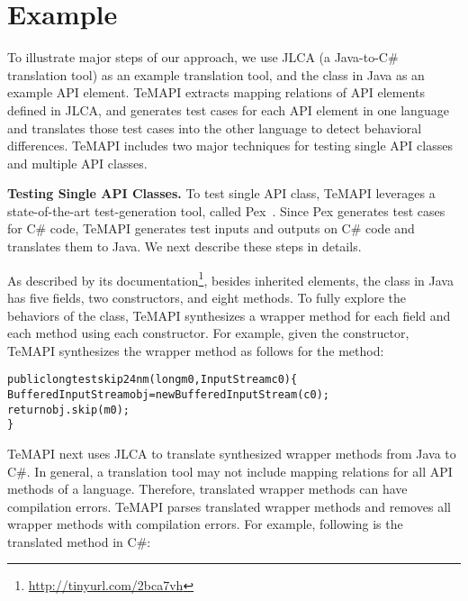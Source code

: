 \section{Example}
\label{sec:example}

To illustrate major steps of our approach, we use JLCA (a Java-to-C\# translation tool) as an example translation tool, and the  class in Java as an example API element. TeMAPI extracts mapping relations of API elements defined in JLCA, and generates test cases for each API element in one language and translates those test cases into the other language to detect behavioral differences. TeMAPI includes two major techniques for testing single API classes and multiple API classes.

\textbf{Testing Single API Classes.} To test single API class, TeMAPI leverages a state-of-the-art test-generation tool, called Pex~\cite{tillmann2008pex}. Since Pex generates test cases for C\# code, TeMAPI generates test inputs and outputs on C\# code and translates them to Java. We next describe these steps in details.

As described by its documentation\footnote{\url{http://tinyurl.com/2bca7vh}}, besides inherited elements, the  class in Java has five fields, two constructors, and eight methods. To fully explore the behaviors of the class, TeMAPI synthesizes a wrapper method for each field and each method using each constructor. For example, given the  constructor, TeMAPI synthesizes the wrapper method as follows for the  method:

\begin{CodeOut}\vspace*{-1ex}
\begin{alltt}
public long testskip24nm(long m0,InputStream c0)\{
  BufferedInputStream obj = new BufferedInputStream(c0);
  return obj.skip(m0);
\}
\end{alltt}
\end{CodeOut}\vspace*{-2ex}

TeMAPI next uses JLCA to translate synthesized wrapper methods from Java to C\#. In general, a translation tool may not include mapping relations for all API methods of a language. Therefore, translated wrapper methods can have compilation errors. TeMAPI parses translated wrapper methods and removes all wrapper methods with compilation errors. For example, following is the translated  method in C\#:

